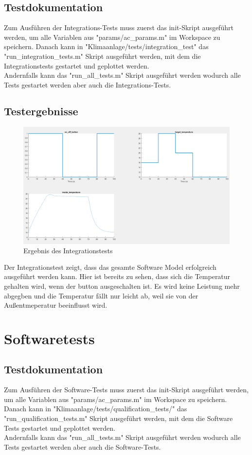 \documentclass[a4paper,12pt]{article}
\begin{document}
\subsection{Testdokumentation}
Zum Ausführen der Integrations-Tests muss zuerst das init-Skript ausgeführt werden, um alle Variablen aus "params/ac\_params.m" im Workspace zu speichern. Danach kann in "Klimaanlage/tests/integration\_test" das "run\_integration\_tests.m" Skript ausgeführt werden, mit dem die Integrationstests gestartet und geplottet werden. 
\\
Andernfalls kann das "run\_all\_tests.m" Skript ausgeführt werden wodurch alle Tests gestartet werden aber auch die Integrations-Tests.

\newpage

\subsection{Testergebnisse}
\begin{figure}[h!]
	\centering
	\includegraphics[width=\textwidth]{integration_test.png}
	\caption{Ergebnis des Integrationstests}
\end{figure}
Der Integrationstest zeigt, dass das gesamte Software Model erfolgreich ausgeführt werden kann. Hier ist bereits zu sehen, dass sich die Temperatur gehalten wird, wenn der button ausgeschalten ist. Es wird keine Leistung mehr abgegben und die Temperatur fällt nur leicht ab, weil sie von der Außentmeperatur beeinflusst wird. 

\newpage

\section{Softwaretests}
\subsection{Testdokumentation}
Zum Ausführen der Software-Tests muss zuerst das init-Skript ausgeführt werden, um alle Variablen aus "params/ac\_params.m" im Workspace zu speichern. Danach kann in "Klimaanlage/tests/qualification\_tests/" das "run\_qualification\_tests.m" Skript ausgeführt werden, mit dem die Software Tests gestartet und geplottet werden. 
\\
Andernfalls kann das "run\_all\_tests.m" Skript ausgeführt werden wodurch alle Tests gestartet werden aber auch die Software-Tests.
\end{document}
